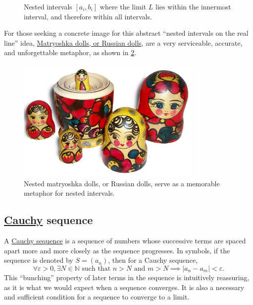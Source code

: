 \documentclass[
  a4paper,
]{article}
\begin{document}
\begin{figure}
\centering

\caption{Nested intervals \([a_i, b_i]\) where the limit \(L\) lies
within the innermost interval, and therefore within all
intervals.}\label{fig:nested-bilateral}
\end{figure}

For those seeking a concrete image for this abstract ``nested intervals
on the real line'' idea,
\href{https://en.wikipedia.org/wiki/Matryoshka_doll}{Matryoshka dolls,
or Russian dolls}, are a very serviceable, accurate, and unforgettable
metaphor, as shown in \cref{fig:matryoshka}.

\begin{figure}
\centering
\includegraphics[width=0.8\textwidth,height=\textheight]{images/matryoshka-open.jpg}
\caption[Nested matryoshka dolls, or Russian dolls, serve as a memorable
metaphor for nested intervals.]{Nested matryoshka dolls, or Russian
dolls, serve as a memorable metaphor for nested
intervals.\footnotemark{}}\label{fig:matryoshka}
\end{figure}

\subsection{\texorpdfstring{\href{https://en.wikipedia.org/wiki/Augustin-Louis_Cauchy}{Cauchy}
sequence}{Cauchy sequence}}\label{cauchy-sequence}

A \href{https://en.wikipedia.org/wiki/Cauchy_sequence}{Cauchy sequence}
is a sequence of numbers whose successive terms are spaced apart more
and more closely as the sequence progresses. In symbols, if the sequence
is denoted by \(S = (a_n)\), then for a Cauchy sequence, \[
\forall \varepsilon > 0, \exists N \in \mathbb{N} \text{ such that } n > N \text{ and } m > N \implies |a_n - a_m| < \varepsilon.
\] This ``bunching'' property of later terms in the sequence is
intuitively reassuring, as it is what we would expect when a sequence
converges. It is also a necessary and sufficient condition for a
sequence to converge to a limit.
\end{document}
